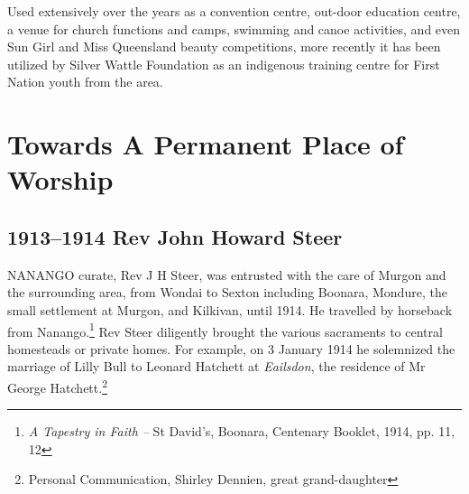 \balance


Used extensively over the years as a convention centre, out-door education centre, a venue for church functions and camps, swimming and canoe activities, and even Sun Girl and Miss Queensland beauty competitions, more recently it has been utilized by Silver Wattle Foundation as an indigenous training centre for First Nation youth from the area.



\printendnotes[custom]
\setcounter{endnote}{0}




\chapter{Towards A Permanent Place of Worship}
\nobalance


\section{1913--1914 Rev John Howard Steer}



\lettrine[lines=3]{N}{ANANGO}
 curate, Rev J H Steer, was entrusted with the care of Murgon and the surrounding area, from Wondai to Sexton including Boonara, Mondure, the small settlement at Murgon, and Kilkivan, until 1914. He travelled by horseback from Nanango.\footnote{\emph{A Tapestry in Faith --} St David's, Boonara, Centenary Booklet, 1914, pp. 11, 12} Rev Steer diligently brought the various sacraments to central homesteads or private homes. For example, on 3 January 1914 he solemnized the marriage of Lilly Bull to Leonard Hatchett at \emph{Eailsdon}, the residence of Mr George Hatchett.\footnote{Personal Communication, Shirley Dennien, great grand-daughter}







